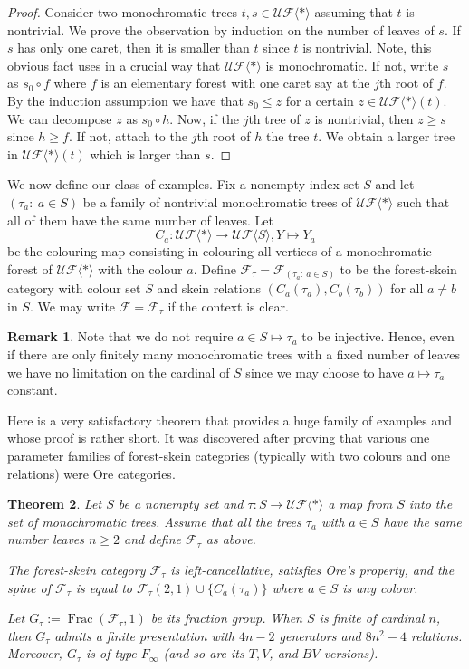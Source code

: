 \documentclass[a4paper, 12pt]{amsart}
\numberwithin{equation}{section}
\newtheorem{theorem}{Theorem}[section]
\theoremstyle{definition}
\newtheorem{remark}[theorem]{Remark}
\newcommand{\cF}{\mathcal F}
\DeclareMathOperator{\Frac}{Frac}
\newcommand{\la}{\langle}
\newcommand{\ra}{\rangle}
\newcommand{\cUF}{\mathcal{UF}}
\begin{document}
\begin{proof}
Consider two monochromatic trees $t,s\in\cUF\la*\ra$ assuming that $t$ is nontrivial.
We prove the observation by induction on the number of leaves of $s$.
If $s$ has only one caret, then it is smaller than $t$ since $t$ is nontrivial.
Note, this obvious fact uses in a crucial way that $\cUF\la*\ra$ is monochromatic. 
If not, write $s$ as $s_0\circ f$ where $f$ is an elementary forest with one caret say at the $j$th root of $f$.
By the induction assumption we have that $s_0\leq z$ for a certain $z\in\cUF\la*\ra(t)$.
We can decompose $z$ as $s_0\circ h$.
Now, if the $j$th tree of $z$ is nontrivial, then $z\geq s$ since $h\geq f$.
If not, attach to the $j$th root of $h$ the tree $t$.
We obtain a larger tree in $\cUF\la*\ra(t)$ which is larger than $s$.
\end{proof}

We now define our class of examples.
Fix a nonempty index set $S$ and let $(\tau_a:\ a\in S)$ be a family of nontrivial monochromatic trees of $\cUF\la *\ra$ such that all of them have the same number of leaves.
Let $$C_a:\cUF\la*\ra\to \cUF\la S\ra, Y\mapsto Y_{a}$$
be the colouring map consisting in colouring all vertices of a monochromatic forest of $\cUF\la*\ra$ with the colour $a$.
Define $\cF_\tau=\cF_{(\tau_a:\ a\in S)}$ to be the forest-skein category with colour set $S$ and skein relations  $(C_a(\tau_a), C_{b}(\tau_{b}))$ for all $a\neq b$ in $S$.
We may write $\cF=\cF_\tau$ if the context is clear.

\begin{remark}
Note that we do not require $a\in S\mapsto \tau_a$ to be injective. 
Hence, even if there are only finitely many monochromatic trees with a fixed number of leaves we have no limitation on the cardinal of $S$ since we may choose to have $a\mapsto \tau_a$ constant.
\end{remark}

Here is a very satisfactory theorem that provides a huge family of examples and whose proof is rather short. It was discovered after proving that various one parameter families of forest-skein categories (typically with two colours and one relations) were Ore categories. 

\begin{theorem}\label{theo:class-example}
Let $S$ be a nonempty set and $\tau:S\to\cUF\la*\ra$ a map from $S$ into the set of monochromatic trees.
Assume that all the trees $\tau_a$ with $a\in S$ have the same number leaves $n\geq 2$ and define $\cF_\tau$ as above.

The forest-skein category $\cF_\tau$ is left-cancellative, satisfies Ore's property, and the spine of $\cF_\tau$ is equal to $\cF_\tau(2,1)\cup\{C_a(\tau_a)\}$ where $a\in S$ is any colour.

Let $G_\tau:=\Frac(\cF_\tau,1)$ be its fraction group.
When $S$ is finite of cardinal $n$, then $G_\tau$ admits a finite presentation with $4n-2$ generators and $8n^2-4$ relations. 
Moreover, $G_\tau$ is of type $F_\infty$ (and so are its $T,V$, and $BV$-versions).
\end{theorem}
\end{document}
